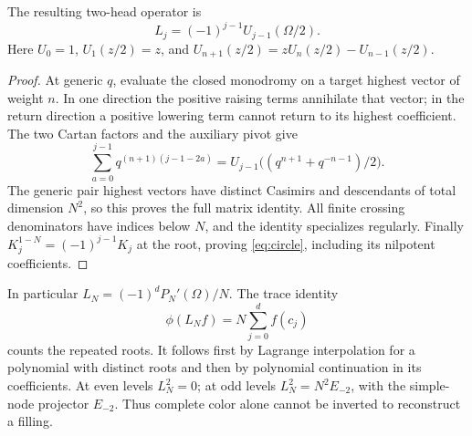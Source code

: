 \begin{proposition}\label{prop:circle}
The resulting two-head operator is
\begin{equation}\label{eq:circle}
 L_j=(-1)^{j-1}U_{j-1}(\Omega/2).
\end{equation}
Here $U_0=1$, $U_1(z/2)=z$, and $U_{n+1}(z/2)=zU_n(z/2)-U_{n-1}(z/2)$.
\end{proposition}
\begin{proof}
At generic $q$, evaluate the closed monodromy on a target highest vector of weight $n$. In one direction the positive raising terms annihilate that vector; in the return direction a positive lowering term cannot return to its highest coefficient. The two Cartan factors and the auxiliary pivot give
\[
 \sum_{a=0}^{j-1}q^{(n+1)(j-1-2a)}
 =U_{j-1}\bigl((q^{n+1}+q^{-n-1})/2\bigr).
\]
The generic pair highest vectors have distinct Casimirs and descendants of total dimension $N^2$, so this proves the full matrix identity. All finite crossing denominators have indices below $N$, and the identity specializes regularly. Finally $K_j^{1-N}=(-1)^{j-1}K_j$ at the root, proving \eqref{eq:circle}, including its nilpotent coefficients.
\end{proof}

In particular $L_N=(-1)^dP_N'(\Omega)/N$. The trace identity
\begin{equation}\label{eq:circle-trace}
 \phi(L_Nf)=N\sum_{j=0}^{d}f(c_j)
\end{equation}
counts the repeated roots. It follows first by Lagrange interpolation for a polynomial with distinct roots and then by polynomial continuation in its coefficients. At even levels $L_N^2=0$; at odd levels $L_N^2=N^2E_{-2}$, with the simple-node projector $E_{-2}$. Thus complete color alone cannot be inverted to reconstruct a filling.

